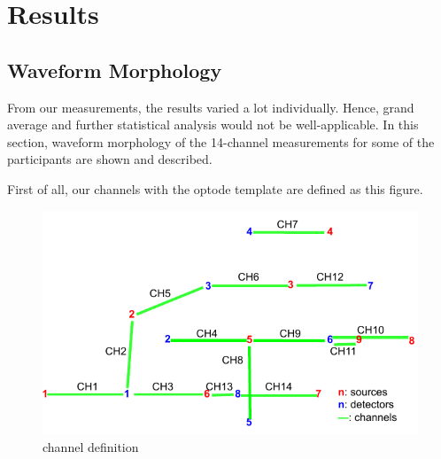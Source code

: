 \chapter{Results}
\section {Waveform Morphology}
From our measurements, the results varied a lot individually. Hence, grand average and further statistical analysis would not be well-applicable. In this section, waveform morphology of the 14-channel measurements for some of the participants are shown and described.

First of all, our channels with the optode template are defined as this figure.

\begin{figure}[H]
\centering
\begin{minipage}[c]{.75\linewidth}
  \centering
  \includegraphics[scale= 0.78, origin= c]{pdf/optode_template.pdf}
  \caption{channel definition}
\end{minipage} \hfill
\begin{minipage}[c]{.22\linewidth}
  \centering

\end{minipage}
\end{figure}
